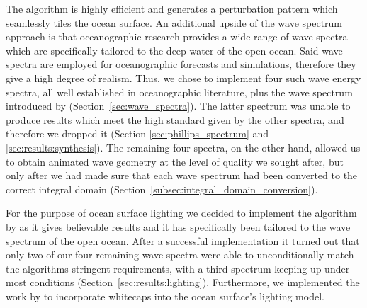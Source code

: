 The \FFT algorithm is highly efficient and generates a perturbation
pattern which seamlessly tiles the ocean surface.
An additional upside of the wave spectrum approach is that oceanographic
research provides a wide range of wave spectra which are specifically
tailored to the deep water of the open ocean. Said wave spectra are
employed for oceanographic forecasts and simulations, therefore they
give a high degree of realism.
Thus, we chose to implement four such wave energy spectra,
all well established in oceanographic literature, plus the wave
spectrum introduced by \citeauthor{course:simulatingocean} (Section~\ref{sec:wave_spectra}).
The latter spectrum was unable to produce results which meet the high
standard given by the other spectra, and therefore we dropped it
(Section \ref{sec:phillips_spectrum} and \ref{sec:results:synthesis}).
The remaining four spectra, on the other hand, allowed us to obtain
animated wave geometry at the level of quality we sought after,
but only after we had made sure that each wave spectrum had been converted
to the correct integral domain (Section~\ref{subsec:integral_domain_conversion}).
%

For the purpose of ocean surface lighting we decided to implement the
algorithm by \citet{misc:oceanlightingfft} as it gives believable results
and it has specifically been tailored to the wave spectrum of the open ocean.
After a successful implementation it turned out that only two of our
four remaining wave spectra were able to unconditionally match the algorithms
stringent requirements, with a third spectrum keeping up under most
conditions (Section~\ref{sec:results:lighting}).
Furthermore, we implemented the work by \citet{article:whitecaps} to
incorporate whitecaps into the ocean surface's lighting model.

